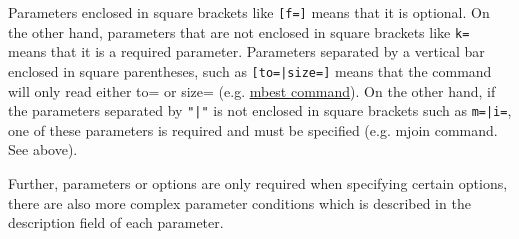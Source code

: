 Parameters enclosed in square brackets like \verb|[f=]| means that it is optional. On the other hand, parameters that are not enclosed in square brackets like \verb|k=| means that it is a required parameter. Parameters separated by a vertical bar enclosed in square parentheses, such as \verb/[to=|size=]/ means that the command will only read either to= or size=  (e.g. \hyperref[sect:mbest]{mbest command}). On the other hand, if the parameters separated by \verb/"|"/ is not enclosed in square brackets such as \verb/m=|i=/, one of these parameters is required and must be specified (e.g. mjoin command. See above).

Further, parameters or options are only required when specifying certain options, there are also more complex parameter conditions which is described in the description field of each parameter.

%
